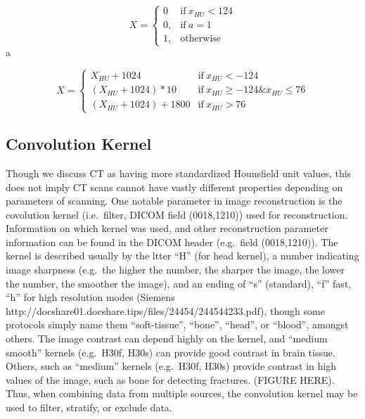 \documentclass[]{elsarticle} %
\begin{document}
\begin{equation}
X=
\begin{cases}
0 & \text{if}\ x_{HU} < 124 \\
0, & \text{if}\ a=1 \\
1, & \text{otherwise}
\end{cases}
\end{equation}a

\begin{equation}
    X=
    \begin{cases}
      X_{HU} + 1024 & \text{if}\ x_{HU} < -124 \\
      (X_{HU} + 1024) * 10 & \text{if}\ x_{HU} \geq -124 \& x_{HU} \leq 76 \\
      (X_{HU} + 1024) + 1800 & \text{if}\ x_{HU} > 76
    \end{cases}
  \end{equation}

\hypertarget{convolution-kernel}{%
\subsection{Convolution Kernel}\label{convolution-kernel}}

Though we discuss CT as having more standardized Hounsfield unit values,
this does not imply CT scans cannot have vastly different properties
depending on parameters of scanning. One notable parameter in image
reconstruction is the covolution kernel (i.e.~filter, DICOM field
(0018,1210)) used for reconstruction. Information on which kernel was
used, and other reconstruction parameter information can be found in the
DICOM header (e.g.~field (0018,1210)). The kernel is described usually
by the ltter ``H'' (for head kernel), a number indicating image
sharpness (e.g.~the higher the number, the sharper the image, the lower
the number, the smoother the image), and an ending of ``s'' (standard),
``f'' fast, ``h'' for high resolution modes (Siemens
http://docshare01.docshare.tips/files/24454/244544233.pdf), though some
protocols simply name them ``soft-tissue'', ``bone'', ``head'', or
``blood'', amongst others. The image contrast can depend highly on the
kernel, and ``medium smooth'' kernels (e.g.~H30f, H30s) can provide good
contrast in brain tissue. Others, such as ``medium'' kernels (e.g.~H30f,
H30s) provide contrast in high values of the image, such as bone for
detecting fractures. (FIGURE HERE). Thus, when combining data from
multiple sources, the convolution kernel may be used to filter,
stratify, or exclude data.
\end{document}
